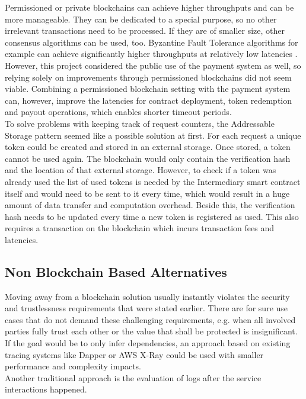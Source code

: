\documentclass[a4paper,12pt]{scrartcl}
\begin{document}
Permissioned or private blockchains can achieve higher throughputs and can be more manageable. They can be dedicated to a special purpose, so no other irrelevant transactions need to be processed. If they are of smaller size, other consensus algorithms can be used, too. Byzantine Fault Tolerance algorithms for example can achieve significantly higher throughputs at relatively low latencies \cite{Li2017}.\\
However, this project considered the public use of the payment system as well, so relying solely on improvements through permissioned blockchains did not seem viable. Combining a permissioned blockchain setting with the payment system can, however, improve the latencies for contract deployment, token redemption and payout operations, which enables shorter timeout periods.\\

To solve problems with keeping track of request counters, the Addressable Storage pattern seemed like a possible solution at first. For each request a unique token could be created and stored in an external storage. Once stored, a token cannot be used again. The blockchain would only contain the verification hash and the location of that external storage. However, to check if a token was already used the list of used tokens is needed by the Intermediary smart contract itself and would need to be sent to it every time, which would result in a huge amount of data transfer and computation overhead. Beside this, the verification hash needs to be updated every time a new token is registered as used. This also requires a transaction on the blockchain which incurs transaction fees and latencies.

\subsection{Non Blockchain Based Alternatives}

Moving away from a blockchain solution usually instantly violates the security and trustlessness requirements that were stated earlier. There are for sure use cases that do not demand these challenging requirements, e.g. when all involved parties fully trust each other or the value that shall be protected is insignificant.\\

If the goal would be to only infer dependencies, an approach based on existing tracing systems like Dapper \cite{Sigelman2010} or AWS X-Ray \cite{web41} could be used with smaller performance and complexity impacts.\\
Another traditional approach is the evaluation of logs after the service interactions happened.\\
\end{document}
